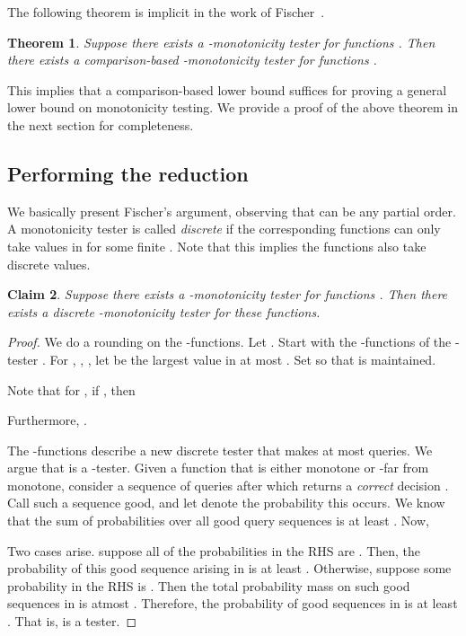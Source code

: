 \documentclass[11pt]{article}
\newtheorem{theorem}{Theorem}[section]
\newtheorem{claim}[theorem]{Claim}
\begin{document}
The following theorem is implicit in the work of Fischer~\cite{E04}.

\begin{theorem} \label{thm:fischer} Suppose there exists a -monotonicity tester
for functions . Then there exists a comparison-based -monotonicity tester
for functions .
\end{theorem}

This implies that a comparison-based lower bound suffices for proving a general lower bound on monotonicity testing.
We provide a proof of the above theorem in the next section for completeness.

\subsection{Performing the reduction} \label{sec:comp}

We basically present Fischer's argument, observing that  can be any partial order. 
A monotonicity tester is called \emph{discrete} if the corresponding functions  can
only take values in  for some finite . Note that this implies the functions  also take discrete values.

\begin{claim} \label{clm:discrete} Suppose there exists a -monotonicity tester 
for functions . Then there exists a discrete -monotonicity tester for these functions.
\end{claim}
\def\p{\hat{p}}

\begin{proof} We do a rounding on the -functions. Let .
Start with the -functions of the -tester .
For , , , let 
 be the largest value in 
at most . 
Set  so that  is maintained. 

Note that for  , if , then 

Furthermore, .


The -functions describe a new discrete tester  that makes at most  queries. We argue that  is a -tester.
Given a function  that is either monotone or -far from monotone, 
consider a sequence of queries  after which  returns a {\em correct} decision . 
Call such a sequence good, and let  denote the probability this occurs. We know that the sum of probabilities over all good query sequences is at least . Now,


Two cases arise. suppose all of the probabilities in the RHS are . Then, the probability of this good sequence arising in  is at least .
Otherwise, suppose some probability in the RHS is . Then the total probability mass on such good sequences in  is atmost .
Therefore, the probability of good sequences in  is at least .
That is,  is a  tester.
\end{proof}
\end{document}
